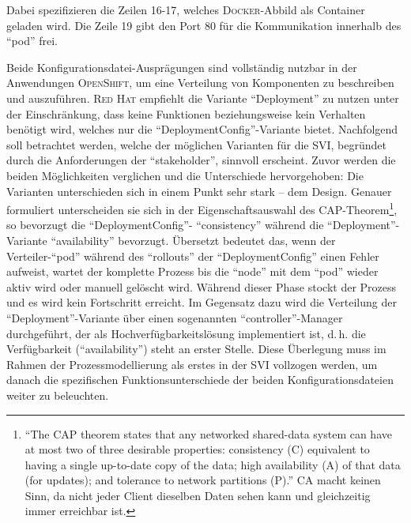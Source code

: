 Dabei spezifizieren die Zeilen 16-17, welches \textsc{Docker}-Abbild als Container geladen wird. Die Zeile 19 gibt den Port 80 für die Kommunikation innerhalb des \enquote{pod} frei.
\par
Beide Konfigurationsdatei-Ausprägungen sind vollständig nutzbar in der Anwendungen \textsc{OpenShift}, um eine Verteilung von Komponenten zu beschreiben und auszuführen. \textsc{Red Hat} empfiehlt die Variante \enquote{Deployment} zu nutzen unter der Einschränkung, dass keine Funktionen beziehungsweise kein Verhalten benötigt wird, welches nur die \enquote{DeploymentConfig}-Variante bietet.\autocite[vgl.][Application\,$\rightarrow$\,Deployments]{red_hat_inc_okd_2019} Nachfolgend soll betrachtet werden, welche der möglichen Varianten für die \ac{SVI}, begründet durch die Anforderungen der \enquote{stakeholder}, sinnvoll erscheint. Zuvor werden die beiden Möglichkeiten verglichen und die Unterschiede hervorgehoben: Die Varianten unterschieden sich in einem Punkt sehr stark -- dem Design. Genauer formuliert unterscheiden sie sich in der Eigenschaftsauswahl des CAP-Theorem\footnote{\enquote{The CAP theorem states that any networked shared-data system can have at most two of three desirable properties: consistency (C) equivalent to having a single up-to-date copy of the data; high availability (A) of that data (for updates); and tolerance to network partitions (P).}\autocite[][S.\,1]{brewer_cap_2012} CA macht keinen Sinn, da nicht jeder Client dieselben Daten sehen kann und gleichzeitig immer erreichbar ist.}, so bevorzugt die \enquote{DeploymentConfig}- \enquote{consistency} während die \enquote{Deployment}-Variante \enquote{availability} bevorzugt. Übersetzt bedeutet das, wenn der Verteiler-\enquote{pod} während des \enquote{rollouts} der \enquote{DeploymentConfig} einen Fehler aufweist, wartet der komplette Prozess bis die \enquote{node} mit dem \enquote{pod} wieder aktiv wird oder manuell gelöscht wird. Während dieser Phase stockt der Prozess und es wird kein Fortschritt erreicht. Im Gegensatz dazu wird die Verteilung der \enquote{Deployment}-Variante über einen sogenannten \enquote{controller}-Manager durchgeführt, der als Hochverfügbarkeitslösung implementiert ist, d.\,h. die Verfügbarkeit (\enquote{availability}) steht an erster Stelle. Diese Überlegung muss im Rahmen der Prozessmodellierung als erstes in der \ac{SVI} vollzogen werden, um danach die spezifischen Funktionsunterschiede der beiden Konfigurationsdateien weiter zu beleuchten. 
\par
